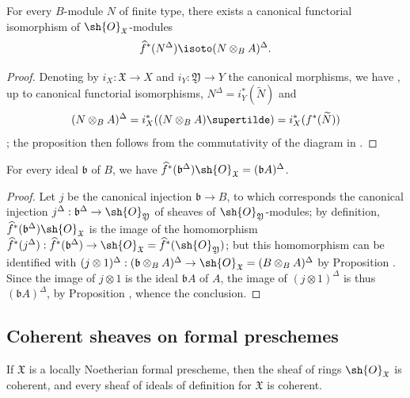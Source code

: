 \begin{proposition}[10.10.8]
\label{I.10.10.8}
For every $B$-module $N$ of finite type, there exists a canonical functorial isomorphism of $\sh{O}_\mathfrak{X}$-modules
\[
  \widehat{f}^*(N^\Delta)\isoto(N\otimes_B A)^\Delta.
\]
\end{proposition}

\begin{proof}
Denoting by $i_X:\mathfrak{X}\to X$ and $i_Y:\mathfrak{Y}\to Y$ the canonical morphisms, we have , up to canonical functorial isomorphisms, $N^\Delta=i_Y^*(\widetilde{N})$ and
\[
  (N\otimes_B A)^\Delta=i_X^*((N\otimes_B A)\supertilde)=i_X^*(f^*(\widetilde{N}))
\]
; the proposition then follows from the commutativity of the diagram in .
\end{proof}

\begin{corollary}[10.10.9]
\label{I.10.10.9}
For every ideal $\mathfrak{b}$ of $B$, we have $\widehat{f}^*(\mathfrak{b}^\Delta)\sh{O}_\mathfrak{X}=(\mathfrak{b}A)^\Delta$.
\end{corollary}

\begin{proof}
Let $j$ be the canonical injection $\mathfrak{b}\to B$, to which corresponds the canonical injection $j^\Delta:\mathfrak{b}^\Delta\to\sh{O}_\mathfrak{Y}$ of sheaves of $\sh{O}_\mathfrak{Y}$-modules; by definition, $\widehat{f}^*(\mathfrak{b}^\Delta)\sh{O}_\mathfrak{X}$ is the image of the homomorphism $\widehat{f}^*(j^\Delta):\widehat{f}^*(\mathfrak{b}^\Delta)\to\sh{O}_\mathfrak{X}=\widehat{f}^*(\sh{O}_\mathfrak{Y})$; but this homomorphism can be identified with $(j\otimes 1)^\Delta:(\mathfrak{b}\otimes_B A)^\Delta\to\sh{O}_\mathfrak{X}=(B\otimes_B A)^\Delta$ by Proposition .
Since the image of $j\otimes 1$ is the ideal $\mathfrak{b}A$ of $A$, the image of $(j\otimes 1)^\Delta$ is thus $(\mathfrak{b}A)^\Delta$, by Proposition , whence the conclusion.
\end{proof}

\subsection{Coherent sheaves on formal preschemes}
\label{subsection:I.10.11}

\begin{proposition}[10.11.1]
\label{I.10.11.1}
If $\mathfrak{X}$ is a locally Noetherian formal prescheme, then the sheaf of rings $\sh{O}_\mathfrak{X}$ is coherent, and every sheaf of ideals of definition for $\mathfrak{X}$ is coherent.
\end{proposition}

